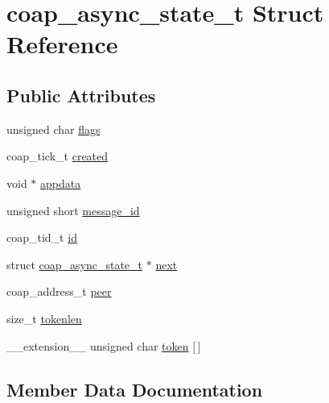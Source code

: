 \hypertarget{structcoap__async__state__t}{}\section{coap\+\_\+async\+\_\+state\+\_\+t Struct Reference}
\label{structcoap__async__state__t}
\subsection*{Public Attributes}
\begin{DoxyCompactItemize}
\item 
unsigned char \hyperlink{structcoap__async__state__t_a34237f37d4c44962f4c4f0dbf39560c1}{flags}
\item 
coap\+\_\+tick\+\_\+t \hyperlink{structcoap__async__state__t_a2ce04f273a47df97dfb8af270c858007}{created}
\item 
void $\ast$ \hyperlink{structcoap__async__state__t_a8bfdf12963290e8284e1510b093b17c1}{appdata}
\item 
unsigned short \hyperlink{structcoap__async__state__t_a94feaa6adcb5c4c244dc33608a37ba3f}{message\+\_\+id}
\item 
coap\+\_\+tid\+\_\+t \hyperlink{structcoap__async__state__t_af6bd1cb2573d3b38e5c1c1175d52f471}{id}
\item 
struct \hyperlink{structcoap__async__state__t}{coap\+\_\+async\+\_\+state\+\_\+t} $\ast$ \hyperlink{structcoap__async__state__t_ac374efafdd91c332f92c8fc5f33f0a0e}{next}
\item 
coap\+\_\+address\+\_\+t \hyperlink{structcoap__async__state__t_a802335931b57f54c9bb134a46ef2322c}{peer}
\item 
size\+\_\+t \hyperlink{structcoap__async__state__t_a9ac15543c19c679be1f77442671454fb}{tokenlen}
\item 
\+\_\+\+\_\+extension\+\_\+\+\_\+ unsigned char \hyperlink{structcoap__async__state__t_a1473f5fc22ca794f1eff2d0c145bdb27}{token} \mbox{[}$\,$\mbox{]}
\end{DoxyCompactItemize}


\subsection{Member Data Documentation}
\hypertarget{structcoap__async__state__t_a8bfdf12963290e8284e1510b093b17c1}{}
